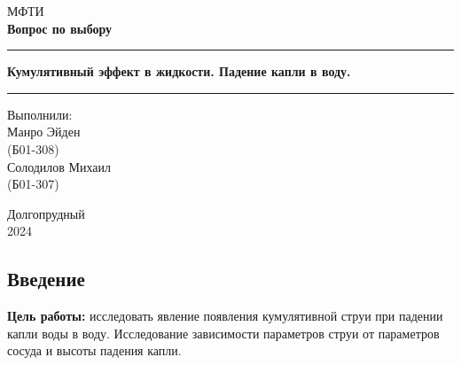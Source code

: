 \documentclass[a4paper, 12pt]{article}
\begin{document}

\begin{titlepage}
    \begin{center}
        \vspace*{5cm}
        \Huge МФТИ
        \vspace*{2cm}\\
        \LARGE \textbf{Вопрос по выбору}
        \\\vspace*{0.25cm}
        
        \noindent\rule{\textwidth}{1pt}
        \vspace*{-0.25cm}
        
        \huge \textbf{Кумулятивный эффект в жидкости. Падение капли
                      в воду.}
        \noindent\rule{\textwidth}{1pt}

        \vfill

        \begin{flushright}
            \begin{minipage}{.4\textwidth}
            \Large Выполнили: \\ Манро Эйден      \\ (Б01-308) 
                              \\ Солодилов Михаил \\ (Б01-307)
            \end{minipage}
        \end{flushright}
        
        \vfill

        \normalsize Долгопрудный \\2024
    \end{center}
\end{titlepage}

\restoregeometry

\begin{center}
    \section*{Введение}
\end{center}

\noindent \textbf{Цель работы:}
исследовать явление появления кумулятивной струи при падении капли
воды в воду. Исследование зависимости параметров струи от параметров
сосуда и высоты падения капли.

\bigskip
\end{document}
